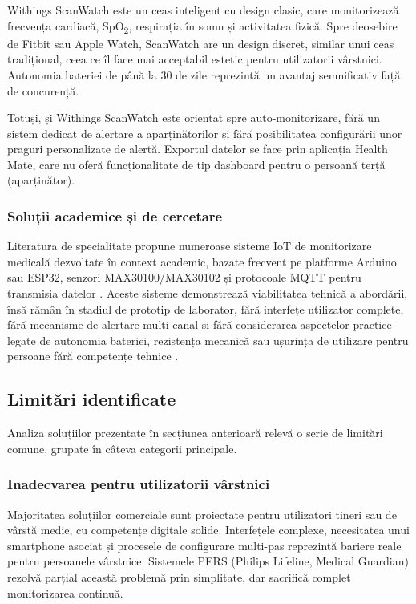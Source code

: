 \documentclass[12pt,a4paper,twoside]{article}
\newcommand{\spo}{SpO\textsubscript{2}}
\begin{document}
Withings ScanWatch este un ceas inteligent cu design clasic, care monitorizează frecvența cardiacă, \spo, respirația în somn și activitatea fizică. Spre deosebire de Fitbit sau Apple Watch, ScanWatch are un design discret, similar unui ceas tradițional, ceea ce îl face mai acceptabil estetic pentru utilizatorii vârstnici. Autonomia bateriei de până la 30 de zile reprezintă un avantaj semnificativ față de concurență.

Totuși, și Withings ScanWatch este orientat spre auto-monitorizare, fără un sistem dedicat de alertare a aparținătorilor și fără posibilitatea configurării unor praguri personalizate de alertă. Exportul datelor se face prin aplicația Health Mate, care nu oferă funcționalitate de tip dashboard pentru o persoană terță (aparținător).

\subsubsection{Soluții academice și de cercetare}

Literatura de specialitate propune numeroase sisteme IoT de monitorizare medicală dezvoltate în context academic, bazate frecvent pe platforme Arduino sau ESP32, senzori MAX30100/MAX30102 și protocoale MQTT pentru transmisia datelor \cite{alshamrani2022, nancy2022, ali2025}. Aceste sisteme demonstrează viabilitatea tehnică a abordării, însă rămân în stadiul de prototip de laborator, fără interfețe utilizator complete, fără mecanisme de alertare multi-canal și fără considerarea aspectelor practice legate de autonomia bateriei, rezistența mecanică sau ușurința de utilizare pentru persoane fără competențe tehnice \cite{shah2026, mollabagher2026}.

\subsection{Limitări identificate}

Analiza soluțiilor prezentate în secțiunea anterioară relevă o serie de limitări comune, grupate în câteva categorii principale.

\subsubsection{Inadecvarea pentru utilizatorii vârstnici}

Majoritatea soluțiilor comerciale sunt proiectate pentru utilizatori tineri sau de vârstă medie, cu competențe digitale solide. Interfețele complexe, necesitatea unui smartphone asociat și procesele de configurare multi-pas reprezintă bariere reale pentru persoanele vârstnice. Sistemele PERS (Philips Lifeline, Medical Guardian) rezolvă parțial această problemă prin simplitate, dar sacrifică complet monitorizarea continuă.
\end{document}
